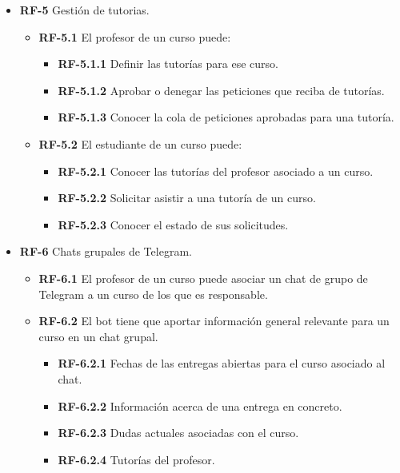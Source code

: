 \begin{itemize}
\item \textbf{RF-5} Gestión de tutorias.
\begin{itemize}

	\item\textbf{RF-5.1} El profesor de un curso puede:
	\begin{itemize}

	\item\textbf{RF-5.1.1} Definir las tutorías para ese curso.
	\item\textbf{RF-5.1.2} Aprobar o denegar las peticiones que reciba de tutorías.
	\item\textbf{RF-5.1.3} Conocer la cola de peticiones aprobadas para una tutoría.
	\end{itemize}
	
	\item\textbf{RF-5.2} El estudiante de un curso puede:
	\begin{itemize}
	\item\textbf{RF-5.2.1} Conocer las tutorías del profesor asociado a  un curso.
	\item\textbf{RF-5.2.2} Solicitar asistir a una tutoría de un curso.
	\item\textbf{RF-5.2.3} Conocer el estado de sus solicitudes.
	\end{itemize}	
	\end{itemize}


\item \textbf{RF-6} Chats grupales de Telegram.
\begin{itemize}

	\item\textbf{RF-6.1} El profesor de un curso puede asociar un chat de grupo de Telegram a un curso de los que es responsable.
	\item\textbf{RF-6.2} El bot tiene que aportar información general relevante para un curso en un chat grupal.
	\begin{itemize}

	\item\textbf{RF-6.2.1} Fechas de las entregas abiertas para el curso asociado al chat.
	\item\textbf{RF-6.2.2} Información acerca de una entrega en concreto.
	\item\textbf{RF-6.2.3} Dudas actuales asociadas con el curso.
	\item\textbf{RF-6.2.4} Tutorías del profesor.
	\end{itemize}
	
	\end{itemize}


\end{itemize}



